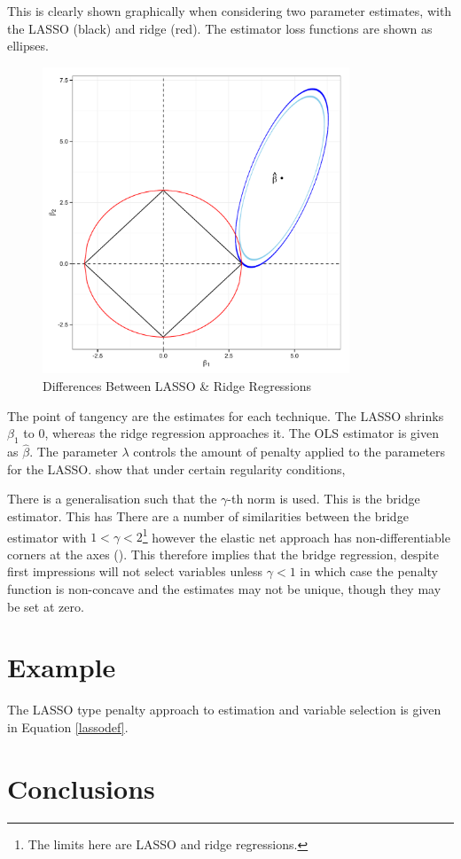 \documentclass[11pt]{article}
\begin{document}
This is clearly shown graphically when considering two parameter estimates, with the LASSO (black) and ridge (red). The estimator loss functions are shown as ellipses.
\begin{figure}[htbp] %
   \centering
   \includegraphics[width=3.6in]{LASSO1} 
   \caption{Differences Between LASSO \& Ridge Regressions}
   \label{lasso1}
\end{figure}
The point of tangency are the estimates for each technique. The LASSO shrinks $\beta_1$ to 0, whereas the ridge regression approaches it. The OLS estimator is given as $\hat{\beta}$. The parameter $\lambda$ controls the amount of penalty applied to the parameters for the LASSO. \cite{knightfu} show that under certain regularity conditions, 

There is a generalisation such that the $\gamma$-th norm is used. This is the bridge estimator. This has There are a number of similarities between the bridge estimator with $1<\gamma<2$\footnote{The limits here are LASSO and ridge regressions.} however the elastic net approach has non-differentiable corners at the axes (\cite{hastiebook}). This therefore implies that the bridge regression, despite first impressions will not select variables unless $\gamma<1$ in which case the penalty function is non-concave and the estimates may not be unique, though they may be set at zero.


\section{Example}

The LASSO type penalty approach to estimation and variable selection is given in Equation \ref{lassodef}. 

\section{Conclusions}




\end{document}
